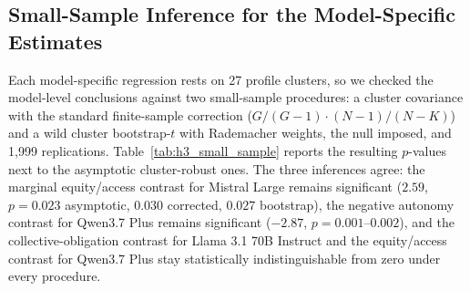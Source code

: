 \documentclass[11pt]{article}
\begin{document}
\clearpage

\subsection{Small-Sample Inference for the Model-Specific Estimates}

Each model-specific regression rests on 27 profile clusters, so we checked the model-level conclusions against two small-sample procedures: a cluster covariance with the standard finite-sample correction ($G/(G-1)\cdot(N-1)/(N-K)$) and a wild cluster bootstrap-$t$ with Rademacher weights, the null imposed, and 1{,}999 replications. Table~\ref{tab:h3_small_sample} reports the resulting $p$-values next to the asymptotic cluster-robust ones. The three inferences agree: the marginal equity/access contrast for Mistral Large remains significant ($2.59$, $p=0.023$ asymptotic, $0.030$ corrected, $0.027$ bootstrap), the negative autonomy contrast for Qwen3.7 Plus remains significant ($-2.87$, $p=0.001$--$0.002$), and the collective-obligation contrast for Llama 3.1 70B Instruct and the equity/access contrast for Qwen3.7 Plus stay statistically indistinguishable from zero under every procedure.
\end{document}
